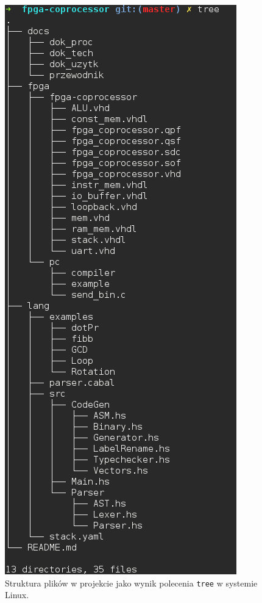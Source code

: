 \begin{figure}
  \begin{center}
    \includegraphics[scale=0.5]{images/file_structure.png}
    \caption{Struktura plików w projekcie jako wynik polecenia \texttt{tree} w systemie Linux.}
    \label{fig:file_structure}
  \end{center}
\end{figure}

